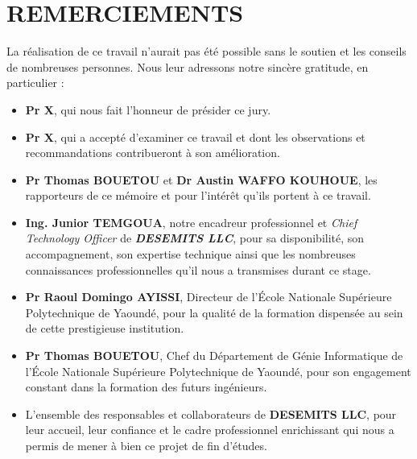 
\chapter*{REMERCIEMENTS}


La réalisation de ce travail n'aurait pas été possible sans le soutien et les conseils de nombreuses personnes. Nous leur adressons notre sincère gratitude, en particulier :
\begin{itemize} %

    \item[$\bullet$] \textbf{Pr X}, qui nous fait l'honneur de présider ce jury.

    \item[$\bullet$] \textbf{Pr X}, qui a accepté d'examiner ce travail et dont les observations et recommandations contribueront à son amélioration.

    \item[$\bullet$] \textbf{Pr Thomas BOUETOU} et \textbf{Dr Austin WAFFO KOUHOUE}, les rapporteurs de ce mémoire et pour l'intérêt qu'ils portent à ce travail.

    \item[$\bullet$] \textbf{Ing. Junior TEMGOUA}, notre encadreur professionnel et \emph{Chief Technology Officer} de \textbf{\emph{DESEMITS LLC}}, pour sa disponibilité, son accompagnement, son expertise technique ainsi que les nombreuses connaissances professionnelles qu'il nous a transmises durant ce stage.

    \item[$\bullet$]\textbf{Pr Raoul Domingo AYISSI}, Directeur de l'École Nationale Supérieure Polytechnique de Yaoundé, pour la qualité de la formation dispensée au sein de cette prestigieuse institution.

    \item[$\bullet$] \textbf{Pr Thomas BOUETOU}, Chef du Département de Génie Informatique de l'École Nationale Supérieure Polytechnique de Yaoundé, pour son engagement constant dans la formation des futurs ingénieurs.

    \item[$\bullet$] L'ensemble des responsables et collaborateurs de \textbf{DESEMITS LLC}, pour leur accueil, leur confiance et le cadre professionnel enrichissant qui nous a permis de mener à bien ce projet de fin d'études.


\end{itemize}
